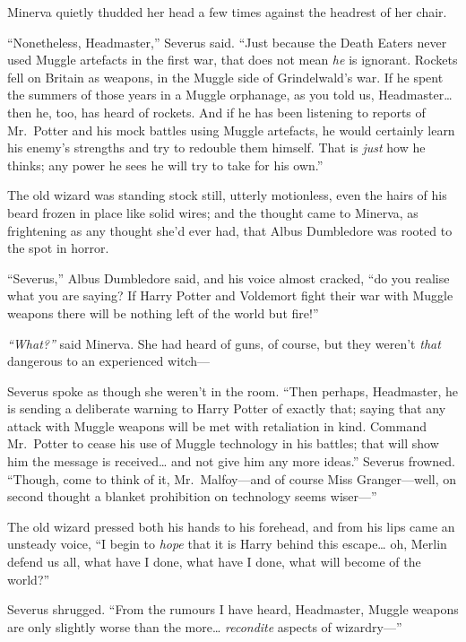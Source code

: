 Minerva quietly thudded her head a few times against the headrest of her
chair.

``Nonetheless, Headmaster,'' Severus said. ``Just because the Death
Eaters never used Muggle artefacts in the first war, that does not mean
\emph{he} is ignorant. Rockets fell on Britain as weapons, in the Muggle
side of Grindelwald's war. If he spent the summers of those years in a
Muggle orphanage, as you told us, Headmaster\ldots{} then he, too, has
heard of rockets. And if he has been listening to reports of Mr.~Potter
and his mock battles using Muggle artefacts, he would certainly learn
his enemy's strengths and try to redouble them himself. That is
\emph{just} how he thinks; any power he sees he will try to take for his
own.''

The old wizard was standing stock still, utterly motionless, even the
hairs of his beard frozen in place like solid wires; and the thought
came to Minerva, as frightening as any thought she'd ever had, that
Albus Dumbledore was rooted to the spot in horror.

``Severus,'' Albus Dumbledore said, and his voice almost cracked, ``do
you realise what you are saying? If Harry Potter and Voldemort fight
their war with Muggle weapons there will be nothing left of the world
but fire!''

\emph{``What?''} said Minerva. She had heard of guns, of course, but
they weren't \emph{that} dangerous to an experienced witch---

Severus spoke as though she weren't in the room. ``Then perhaps,
Headmaster, he is sending a deliberate warning to Harry Potter of
exactly that; saying that any attack with Muggle weapons will be met
with retaliation in kind. Command Mr.~Potter to cease his use of Muggle
technology in his battles; that will show him the message is
received\ldots{} and not give him any more ideas.'' Severus frowned.
``Though, come to think of it, Mr.~Malfoy---and of course Miss
Granger---well, on second thought a blanket prohibition on technology
seems wiser---''

The old wizard pressed both his hands to his forehead, and from his lips
came an unsteady voice, ``I begin to \emph{hope} that it is Harry behind
this escape\ldots{} oh, Merlin defend us all, what have I done, what
have I done, what will become of the world?''

Severus shrugged. ``From the rumours I have heard, Headmaster, Muggle
weapons are only slightly worse than the more\ldots{} \emph{recondite}
aspects of wizardry---''

